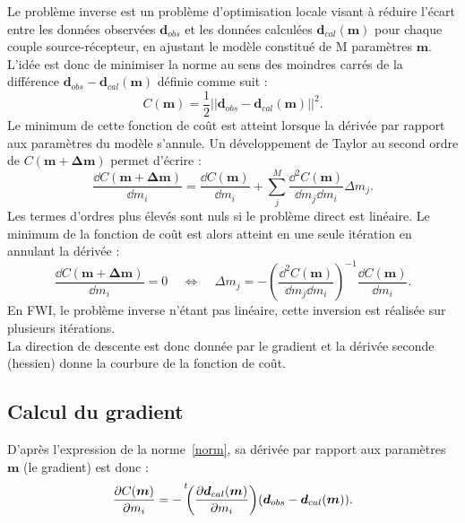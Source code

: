 Le problème inverse est un problème d'optimisation locale visant à réduire l'écart entre les données observées $\bm{d}_{obs}$ et les données calculées $\bm{d}_{cal}(\bm{m})$ pour chaque couple source-récepteur, en ajustant le modèle constitué de M paramètres $\bm{m}$. L'idée est donc de minimiser la norme au sens des moindres carrés de la différence $\bm{d}_{obs}-\bm{d}_{cal}(\bm{m})$ définie comme suit : 
\begin{equation}
	C(\bm{m})=\frac{1}{2}||\bm{d}_{obs}-\bm{d}_{cal}(\bm{m})||^{2}\text{.}
	\label{norm}
\end{equation}
 Le minimum de cette fonction de coût est atteint lorsque la dérivée par rapport aux paramètres du modèle s'annule. Un développement de Taylor au second ordre de $C(\bm{m}+ \bm{\Delta m})$ permet d'écrire : 
 \begin{equation}
 	\frac{\dd C(\bm{m}+\bm{\Delta m})}{\dd m_{i}}= \frac{\dd C(\bm{m})}{\dd m_{i}} + \displaystyle\sum_{j}^{M} \frac{\dd^{2} C(\bm{m})}{\dd m_{j} \dd m_{i}}\Delta m_{j}\text{.}
 \end{equation}
Les termes d'ordres plus élevés sont nuls si le problème direct est linéaire. Le minimum de la fonction de coût est alors atteint en une seule itération en annulant la dérivée : 
\begin{equation}
	\frac{\dd C(\bm{m}+\bm{\Delta m})}{\dd m_{i}} = 0 ~~~~~\Leftrightarrow ~~~~~ \Delta m _{j} = -\left( \frac{\dd ^{2} C(\bm{m})}{\dd m_{j} \dd m_{i} }\right)^{-1} \frac{\dd C (\bm{m})}{\dd m_{i}} \text{.}
\end{equation}
En FWI, le problème inverse n'étant pas linéaire, cette inversion est réalisée sur plusieurs itérations.\\
La direction de descente est donc donnée par le gradient et la dérivée seconde (hessien) donne la courbure de la fonction de coût.\\



\subsection{Calcul du gradient}

D'après l'expression de la norme~\ref{norm}, sa dérivée par rapport aux paramètres $\bm{m}$ (le gradient) est donc : 
\begin{equation}
	 \frac{\dd C (\bm{m})}{\dd m_{i}} = -\tr{\left( \frac{\dd \bm{d}_{cal}(\bm{m}) }{\dd m_{i}} \right)} ( \bm{d}_{obs} - \bm{d}_{cal}(\bm{m})) \text{.}
	 \label{eq_grad}
\end{equation}\\



